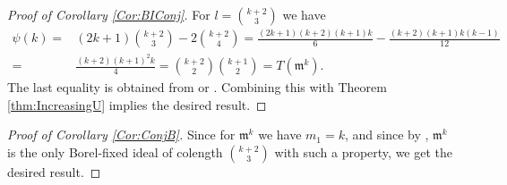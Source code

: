 \documentclass[11pt,a4paper,leqno,noamsfonts]{amsart}
\numberwithin{equation}{section}
\theoremstyle{definition}
\theoremstyle{thm}
\theoremstyle{ex}
\theoremstyle{sol}
\begin{document}
\begin{proof}[Proof of Corollary \ref{Cor:BIConj}] For $l=\binom{k+2}{3}$ we have
\begin{align*}
  \psi(k)=&(2k+1){k+2\choose 3}-2{k+2 \choose 4} = \frac{(2k+1)(k+2)(k+1)k}{6}-\frac{(k+2)(k+1)k(k-1)}{12}\\=&\frac{(k+2)(k+1)^2k}{4}={k+2\choose 2}{k+1\choose 2}=T(\mathfrak{m}^k).
\end{align*}
The last equality is obtained from \cite[Proposition III.4]{Bri-Iar} or \cite[Corollary 1.9]{Rezaee-23-Conjectures}. 
Combining this with Theorem  \ref{thm:IncreasingU}
implies the desired result.
   
\end{proof}

\begin{proof}[Proof of Corollary \ref{Cor:ConjB}] 
Since for $\mathfrak{m}^k$ we have $m_1=k$, and since by \cite[Lemma 1.7]{Rezaee-23-Conjectures}, $\mathfrak{m}^k$ is the only Borel-fixed ideal of colength ${k+2 \choose 3}$ with such a property, we get the desired result.
\end{proof}


       






\vspace{0.25cm}
\end{document}
